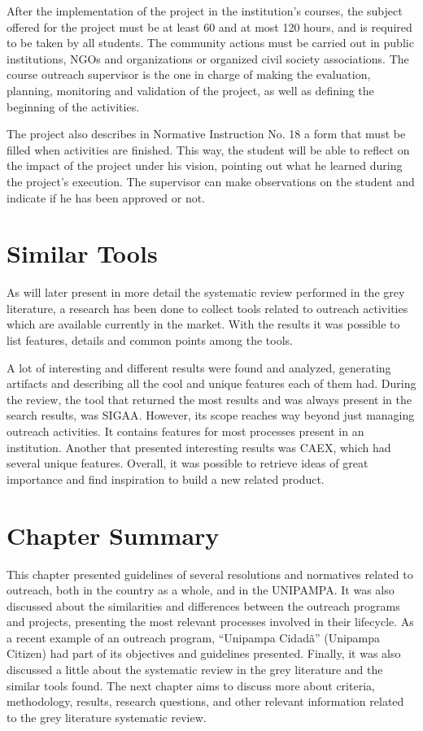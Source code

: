 After the implementation of the project in the institution's courses, the subject offered for the project must be at least 60 and at most 120 hours, and is required to be taken by all students. The community actions must be carried out in public institutions, \aclp{NGO} and organizations or organized civil society associations. The course outreach supervisor is the one in charge of making the evaluation, planning, monitoring and validation of the project, as well as defining the beginning of the activities.

The project also describes in Normative Instruction No. 18 a form that must be filled when activities are finished. This way, the student will be able to reflect on the impact of the project under his vision, pointing out what he learned during the project's execution. The supervisor can make observations on the student and indicate if he has been approved or not.

\section{Similar Tools}\label{sec:bac-tools}

As  will later present in more detail the systematic review performed in the grey literature, a research has been done to collect tools related to outreach activities which are available currently in the market. With the results it was possible to list features, details and common points among the tools.

A lot of interesting and different results were found and analyzed, generating artifacts and describing all the cool and unique features each of them had. During the review, the tool that returned the most results and was always present in the search results, was \ac{SIGAA}. However, its scope reaches way beyond just managing outreach activities. It contains features for most processes present in an institution. Another that presented interesting results was \ac{CAEX}, which had several unique features. Overall, it was possible to retrieve ideas of great importance and find inspiration to build a new related product.

\section{Chapter Summary}\label{sec:bac-summary}

This chapter presented guidelines of several resolutions and normatives related to outreach, both in the country as a whole, and in the \acl{UNIPAMPA}. It was also discussed about the similarities and differences between the outreach programs and projects, presenting the most relevant processes involved in their lifecycle. As a recent example of an outreach program, ``Unipampa Cidadã'' (Unipampa Citizen) had part of its objectives and guidelines presented. Finally, it was also discussed a little about the systematic review in the grey literature and the similar tools found. The next chapter aims to discuss more about criteria, methodology, results, research questions, and other relevant information related to the grey literature systematic review.
